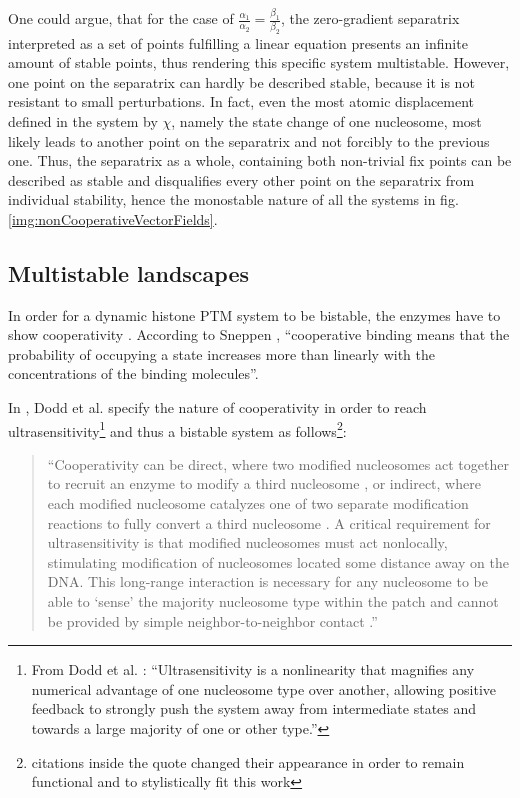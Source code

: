             One could argue, that for the case of $\frac{\alpha_1}{\alpha_2} = \frac{\beta_1}{\beta_2}$, the zero-gradient separatrix interpreted as a set of points fulfilling a linear equation presents an infinite amount of stable points, thus rendering this specific system multistable. However, one point on the separatrix can hardly be described stable, because it is not resistant to small perturbations. In fact, even the most atomic displacement defined in the system by $\chi$, namely the state change of one nucleosome, most likely leads to another point on the separatrix and not forcibly to the previous one. Thus, the separatrix as a whole, containing both non-trivial fix points can be described as stable and disqualifies every other point on the separatrix from individual stability, hence the monostable nature of all the systems in fig. \ref{img:nonCooperativeVectorFields}.


            \subsection{Multistable landscapes}
            In order for a dynamic histone PTM system to be bistable, the enzymes have to show cooperativity \cite{dodd2011barriers,sneppen2019theoretical,mayer2020langevin}. According to Sneppen \cite[][p.48]{sneppen2014models}, \enquote{cooperative binding means that the probability of occupying a state increases more than linearly with the concentrations of the binding molecules}.

            In \cite{dodd2011barriers}, Dodd et al. specify the nature of cooperativity in order to reach ultrasensitivity\footnote{From Dodd et al. \cite{dodd2011barriers}: \enquote{Ultrasensitivity is a nonlinearity that magnifies any numerical advantage of one nucleosome type over another, allowing positive feedback to strongly push the system away from intermediate states and towards a large majority of one or other type.}} and thus a bistable system as follows\footnote{citations inside the quote changed their appearance in order to remain functional and to stylistically fit this work}:

            \begin{quote}
                “Cooperativity can be direct, where two modified nucleosomes act together to recruit an enzyme to modify a third nucleosome \cite{3dodd2007theoretical,11sedighi2007epigenetic,15micheelsen2010theory}, or indirect, where each modified nucleosome catalyzes one of two separate modification reactions to fully convert a third nucleosome \cite{3dodd2007theoretical,13david2009inheritance}. A critical requirement for ultrasensitivity is that modified nucleosomes must act nonlocally, stimulating modification of nucleosomes located some distance away on the DNA. This long-range interaction is necessary for any nucleosome to be able to ‘sense’ the majority nucleosome type within the patch and cannot be provided by simple neighbor-to-neighbor contact \cite{3dodd2007theoretical,15micheelsen2010theory}.”
            \end{quote}

